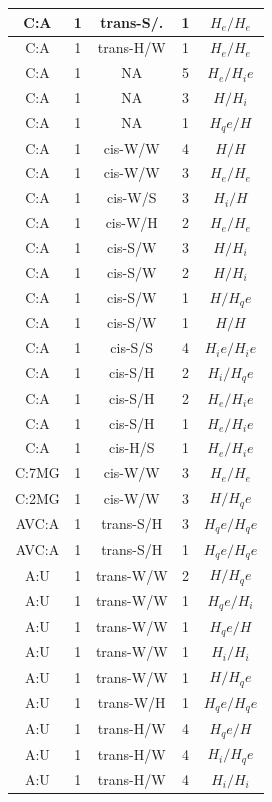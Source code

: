 \begin{center}
\begin{longtable}{c|c|c|c|c}
C:A & 1 & trans-S/. & 1 & $H_e/H_e$ \\  \hline
C:A & 1 & trans-H/W & 1 & $H_e/H_e$ \\  \hline
C:A & 1 & NA & 5 & $H_e/H_ie$ \\  \hline
C:A & 1 & NA & 3 & $H/H_i$ \\  \hline
C:A & 1 & NA & 1 & $H_qe/H$ \\  \hline
C:A & 1 & cis-W/W & 4 & $H/H$ \\  \hline
C:A & 1 & cis-W/W & 3 & $H_e/H_e$ \\  \hline
C:A & 1 & cis-W/S & 3 & $H_i/H$ \\  \hline
C:A & 1 & cis-W/H & 2 & $H_e/H_e$ \\  \hline
C:A & 1 & cis-S/W & 3 & $H/H_i$ \\  \hline
C:A & 1 & cis-S/W & 2 & $H/H_i$ \\  \hline
C:A & 1 & cis-S/W & 1 & $H/H_qe$ \\  \hline
C:A & 1 & cis-S/W & 1 & $H/H$ \\  \hline
C:A & 1 & cis-S/S & 4 & $H_ie/H_ie$ \\  \hline
C:A & 1 & cis-S/H & 2 & $H_i/H_qe$ \\  \hline
C:A & 1 & cis-S/H & 2 & $H_e/H_ie$ \\  \hline
C:A & 1 & cis-S/H & 1 & $H_e/H_ie$ \\  \hline
C:A & 1 & cis-H/S & 1 & $H_e/H_ie$ \\  \hline
C:7MG & 1 & cis-W/W & 3 & $H_e/H_e$ \\  \hline
C:2MG & 1 & cis-W/W & 3 & $H/H_qe$ \\  \hline
AVC:A & 1 & trans-S/H & 3 & $H_qe/H_qe$ \\  \hline
AVC:A & 1 & trans-S/H & 1 & $H_qe/H_qe$ \\  \hline
A:U & 1 & trans-W/W & 2 & $H/H_qe$ \\  \hline
A:U & 1 & trans-W/W & 1 & $H_qe/H_i$ \\  \hline
A:U & 1 & trans-W/W & 1 & $H_qe/H$ \\  \hline
A:U & 1 & trans-W/W & 1 & $H_i/H_i$ \\  \hline
A:U & 1 & trans-W/W & 1 & $H/H_qe$ \\  \hline
A:U & 1 & trans-W/H & 1 & $H_qe/H_qe$ \\  \hline
A:U & 1 & trans-H/W & 4 & $H_qe/H$ \\  \hline
A:U & 1 & trans-H/W & 4 & $H_i/H_qe$ \\  \hline
A:U & 1 & trans-H/W & 4 & $H_i/H_i$ \\  \hline

\end{longtable}
\end{center}
